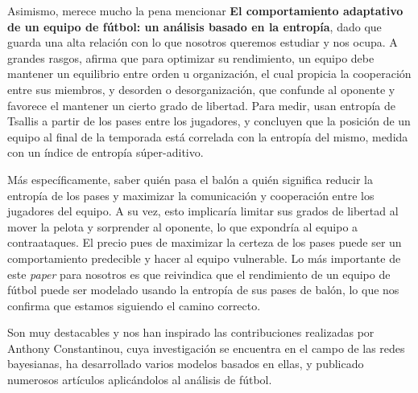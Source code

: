 Asimismo, merece mucho la pena mencionar \textbf{El comportamiento adaptativo de un equipo 
de fútbol: un análisis basado en la entropía}\cite{entropy-analysis}, dado que guarda una 
alta relación con lo que nosotros queremos estudiar y nos ocupa. A grandes rasgos, afirma que 
para optimizar su rendimiento, un equipo debe mantener un equilibrio entre orden u organización, el cual 
propicia la cooperación entre sus miembros, y desorden o desorganización, que confunde 
al oponente y favorece el mantener un cierto grado de libertad. Para medir, usan entropía de 
Tsallis a partir de los pases entre los jugadores, y concluyen que la posición de un equipo al final de la temporada está 
correlada con la entropía del mismo, medida con un índice de entropía súper-aditivo. 

Más específicamente, saber quién pasa el balón a quién significa reducir la entropía de los pases y maximizar 
la comunicación y cooperación entre los jugadores del equipo. A su vez, esto implicaría limitar sus 
grados de libertad al mover la pelota y sorprender al oponente, lo que expondría al equipo a contraataques. El precio 
pues de maximizar la certeza de los pases puede ser un comportamiento predecible y hacer al equipo vulnerable. Lo más importante 
de este \textit{paper} para nosotros es que reivindica que el rendimiento de un equipo de fútbol puede 
ser modelado usando la entropía de sus pases de balón, lo que nos confirma que estamos siguiendo el camino correcto.

Son muy destacables y nos han inspirado las contribuciones realizadas por Anthony 
Constantinou\cite{a-constantinou}, cuya investigación se encuentra en el campo 
de las redes bayesianas, ha desarrollado varios modelos basados en ellas, y publicado 
numerosos artículos aplicándolos al análisis de fútbol. 